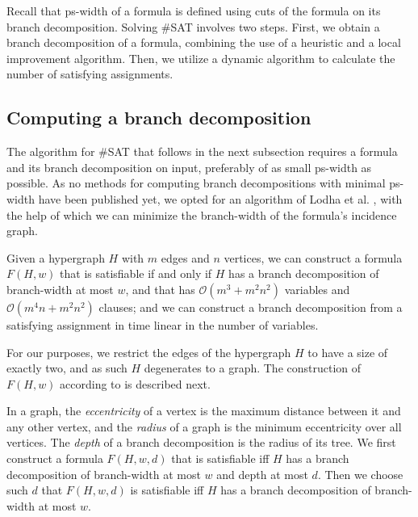 Recall that ps-width of a formula is defined using cuts of the formula on its branch decomposition.
Solving \#SAT involves two steps.
First, we obtain a branch decomposition of a formula, combining the use of a heuristic and a local improvement algorithm.
Then, we utilize a dynamic algorithm to calculate the number of satisfying assignments.


\subsection{Computing a branch decomposition}

The algorithm for \#SAT that follows in the next subsection requires a formula and its branch decomposition on input, preferably of as small ps-width as possible.
As no methods for computing branch decompositions with minimal ps-width have been published yet, we opted for an algorithm of Lodha et al. \cite{DBLP:journals/tocl/LodhaOS19}, with the help of which we can minimize the branch-width of the formula's incidence graph.


\begin{theorem}
	Given a hypergraph $H$ with $m$ edges and $n$ vertices, we can construct a formula $F(H,w)$ that is satisfiable if and only if $H$ has a branch decomposition of branch-width at most $w$, and that has $\mathcal{O}(m^3 + m^2n^2)$ variables and $\mathcal{O}(m^4n + m^2n^2)$ clauses; and we can construct a branch decomposition from a satisfying assignment in time linear in the number of variables.
\end{theorem}

\noindent
For our purposes, we restrict the edges of the hypergraph $H$ to have a size of exactly two, and as such $H$ degenerates to a graph.
The construction of $F(H,w)$ according to \cite{DBLP:journals/tocl/LodhaOS19} is described next.

In a graph, the {\em eccentricity} of a vertex is the maximum distance between it and any other vertex, and the {\em radius} of a graph is the minimum eccentricity over all vertices.
The {\em depth} of a branch decomposition is the radius of its tree.
We first construct a formula $F(H,w,d)$ that is satisfiable iff $H$ has a branch decomposition of branch-width at most $w$ and depth at most $d$.
Then we choose such $d$ that $F(H,w,d)$ is satisfiable iff $H$ has a branch decomposition of branch-width at most $w$.

